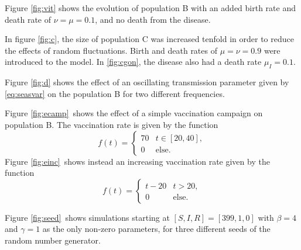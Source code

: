 \documentclass[a4paper,10pt,twocolumn]{article}
\begin{document}
Figure \ref{fig:vit} shows the evolution of population B with an added birth rate and death rate of $\nu=\mu=0.1$, and no death from the disease. 

In figure \ref{fig:c}, the size of population C was increased tenfold in order to reduce the effects of random fluctuations. Birth and death rates of $\mu=\nu=0.9$ were introduced to the model. In \ref{fig:cgon}, the disease also had a death rate $\mu_I = 0.1$. 


Figure \ref{fig:d} shows the effect of an oscillating transmission parameter given by \ref{eq:seasvar} on the population B for two different frequencies.

Figure \ref{fig:ecamp} shows the effect of a simple vaccination campaign on population B. The vaccination rate is given by the function
\begin{equation}\label{eq:fcamp}
f(t) = \begin{cases} 70 &t\in[20,40],\\0&\mathrm{else}. \end{cases}
\end{equation} 
Figure \ref{fig:einc} shows instead an increasing vaccination rate given by the function
\begin{equation}\label{finc}
f(t) = \begin{cases} t-20 &t>20,\\0&\mathrm{else}. \end{cases}
\end{equation}

Figure \ref{fig:seed} shows simulations starting at $[S,I,R] = [399,1,0]$ with $\beta=4$ and $\gamma=1$ as the only non-zero parameters, for three different seeds of the random number generator.
\end{document}
